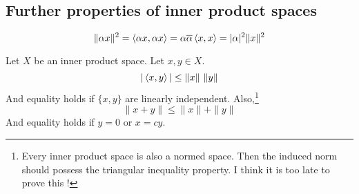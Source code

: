 \subsection{Further properties of inner product spaces}
\begin{remark}
	\[ \|\alpha x \|^2 = \left\langle \alpha x,\alpha x \right\rangle = \alpha \overline{\alpha} \left\langle x,x \right\rangle = |\alpha|^2 \|x\|^2 \]
\end{remark}

\begin{lemma}
	Let $X$ be an inner product space.
	Let $x,y \in X$.
	\[ |\left\langle x,y \right\rangle| \le \|x\| \ \|y\| \]
	And equality holds if $\{x,y\}$ are linearly independent.
	Also,\dag\footnote{Every inner product space is also a normed space. Then the induced norm should possess the triangular inequality property. I think it is too late to prove this !}
	\[ \|x+y\| \le \|x\| + \|y\| \]
	And equality holds if $y = 0$ or $x = cy$.
\end{lemma}
